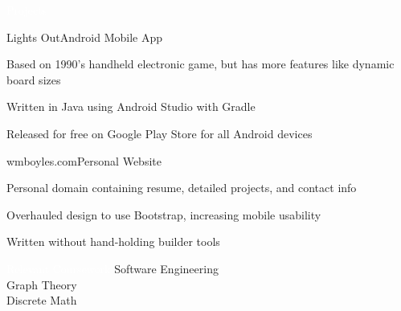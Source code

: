 \documentclass{resume} %
\begin{document}
\begin{rSection}{\colorbox{NCSURED}{\textcolor{WHITE}{Projects}}}
	\begin{rSubsection}{Lights Out}{Android Mobile App}{}{}
		\item Based on 1990's handheld electronic game, but has more features like dynamic board sizes
		\item Written in Java using Android Studio with Gradle
		\item Released for free on Google Play Store for all Android devices
	\end{rSubsection}
	
	\begin{rSubsection}{wmboyles.com}{Personal Website}{}{}
		\item Personal domain containing resume, detailed projects, and contact info
		\item Overhauled design to use Bootstrap, increasing mobile usability
		\item Written without hand-holding builder tools
	\end{rSubsection}	
\end{rSection}

\begin{rSection}{\colorbox{NCSURED}{\textcolor{WHITE}{Relevant Coursework}}}
	{Software Engineering}
	 \\
	{Graph Theory}
	 \\
	{Discrete Math}
\end{rSection}
\end{document}

